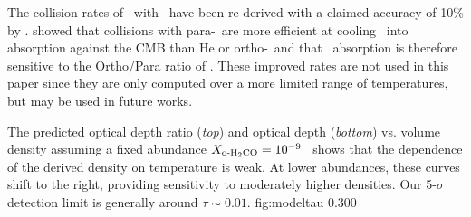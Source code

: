 The collision rates of \formaldehyde\ with \hh\ have been re-derived with a
claimed accuracy of 10\% by \citet{Troscompt2009}.  \citet{Troscompt2009b}
showed that collisions with para-\hh\ are more efficient at cooling
\formaldehyde\ into absorption against the CMB than He or ortho-\hh\ and that
\formaldehyde\ absorption is therefore sensitive to the Ortho/Para ratio of
\hh.   These improved rates are not used in this paper since they are only
computed over a more limited range of temperatures, but may be used in future
works.


{The predicted optical depth ratio ({\it top}) and optical depth ({\it bottom}) vs. volume density
assuming a fixed abundance  $X_{\textrm{o-H}_2\textrm{CO}}=10^{-9}$ \perkmspc\ shows that the
dependence of the derived density on temperature is weak.  At lower abundances,
these curves shift to the right, providing sensitivity to moderately higher
densities.  Our 5-$\sigma$ detection limit is generally around $\tau\sim0.01$.
}
{fig:modeltau}
{0.30}{0}

